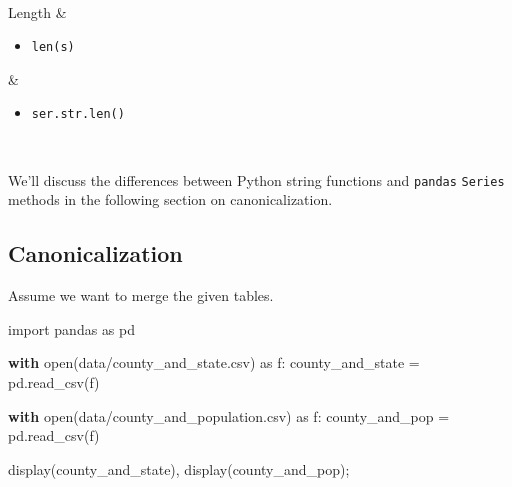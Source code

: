 \documentclass[
  letterpaper,
  DIV=11,
  numbers=noendperiod]{scrreprt}
\newenvironment{Shaded}{\begin{snugshade}}{\end{snugshade}}
\newcommand{\BuiltInTok}[1]{\textcolor[rgb]{0.00,0.23,0.31}{#1}}
\newcommand{\ControlFlowTok}[1]{\textcolor[rgb]{0.00,0.23,0.31}{\textbf{#1}}}
\newcommand{\ImportTok}[1]{\textcolor[rgb]{0.00,0.46,0.62}{#1}}
\newcommand{\NormalTok}[1]{\textcolor[rgb]{0.00,0.23,0.31}{#1}}
\newcommand{\OperatorTok}[1]{\textcolor[rgb]{0.37,0.37,0.37}{#1}}
\newcommand{\StringTok}[1]{\textcolor[rgb]{0.13,0.47,0.30}{#1}}
\providecommand{\tightlist}{%
  \setlength{\itemsep}{0pt}\setlength{\parskip}{0pt}}\usepackage{longtable,booktabs,array}
\begin{document}
\begin{longtable}[]
\begin{minipage}[t]{\linewidth}
\end{minipage} \\
Length & \begin{minipage}[t]{\linewidth}\raggedright
\begin{itemize}
\tightlist
\item
  \texttt{len(s)}
\end{itemize}
\end{minipage} & \begin{minipage}[t]{\linewidth}\raggedright
\begin{itemize}
\tightlist
\item
  \texttt{ser.str.len()}
\end{itemize}
\end{minipage} \\
\end{longtable}

We'll discuss the differences between Python string functions and
\texttt{pandas} \texttt{Series} methods in the following section on
canonicalization.

\subsection{Canonicalization}\label{canonicalization}

Assume we want to merge the given tables.

\begin{Shaded}
\begin{Highlighting}[]
\ImportTok{import}\NormalTok{ pandas }\ImportTok{as}\NormalTok{ pd}

\ControlFlowTok{with} \BuiltInTok{open}\NormalTok{(}\StringTok{\textquotesingle{}data/county\_and\_state.csv\textquotesingle{}}\NormalTok{) }\ImportTok{as}\NormalTok{ f:}
\NormalTok{    county\_and\_state }\OperatorTok{=}\NormalTok{ pd.read\_csv(f)}
    
\ControlFlowTok{with} \BuiltInTok{open}\NormalTok{(}\StringTok{\textquotesingle{}data/county\_and\_population.csv\textquotesingle{}}\NormalTok{) }\ImportTok{as}\NormalTok{ f:}
\NormalTok{    county\_and\_pop }\OperatorTok{=}\NormalTok{ pd.read\_csv(f)}
\end{Highlighting}
\end{Shaded}

\begin{Shaded}
\begin{Highlighting}[]
\NormalTok{display(county\_and\_state), display(county\_and\_pop)}\OperatorTok{;}
\end{Highlighting}
\end{Shaded}
\end{document}
